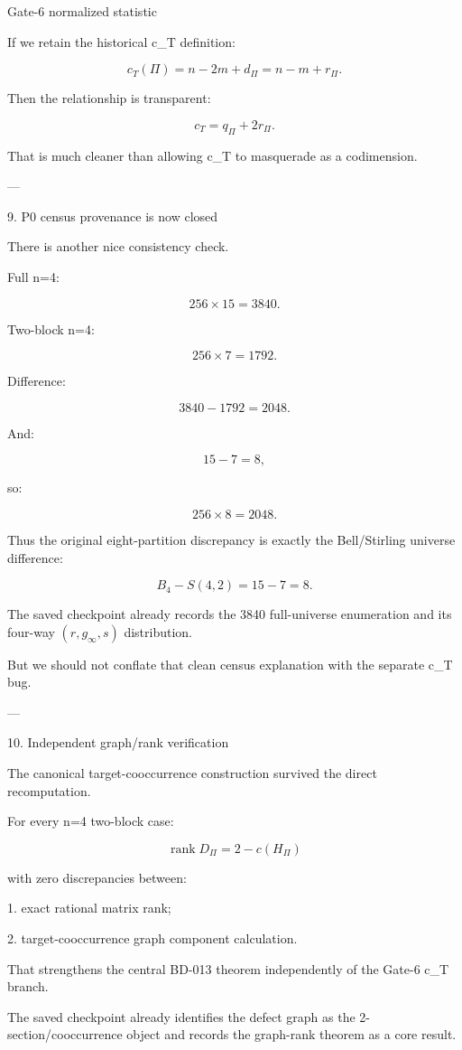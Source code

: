 Gate-6 normalized statistic

If we retain the historical c_T definition:

\[
\boxed{
c_T(\Pi)
=
n-2m+d_\Pi
=
n-m+r_\Pi.
}
\]

Then the relationship is transparent:

\[
\boxed{
c_T=q_\Pi+2r_\Pi.
}
\]

That is much cleaner than allowing c_T to masquerade as a codimension.


---

9. P0 census provenance is now closed

There is another nice consistency check.

Full n=4:

\[
256\times15=3840.
\]

Two-block n=4:

\[
256\times7=1792.
\]

Difference:

\[
3840-1792=2048.
\]

And:

\[
15-7=8,
\]

so:

\[
256\times8=2048.
\]

Thus the original eight-partition discrepancy is exactly the Bell/Stirling universe difference:

\[
B_4-S(4,2)=15-7=8.
\]

The saved checkpoint already records the 3840 full-universe enumeration and its four-way \((r,g_\infty,s)\) distribution. 

But we should not conflate that clean census explanation with the separate c_T bug.


---

10. Independent graph/rank verification

The canonical target-cooccurrence construction survived the direct recomputation.

For every n=4 two-block case:

\[
\boxed{
\operatorname{rank}D_\Pi
=
2-c(H_\Pi)
}
\]

with zero discrepancies between:

1. exact rational matrix rank;


2. target-cooccurrence graph component calculation.



That strengthens the central BD-013 theorem independently of the Gate-6 c_T branch.

The saved checkpoint already identifies the defect graph as the 2-section/cooccurrence object and records the graph-rank theorem as a core result. 


